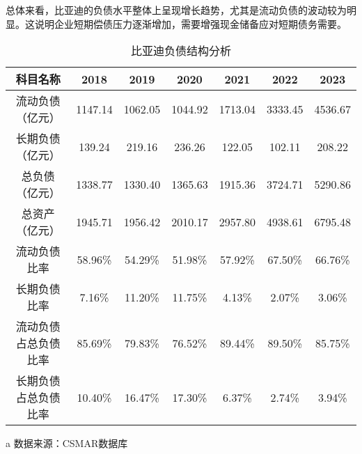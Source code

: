 总体来看，比亚迪的负债水平整体上呈现增长趋势，尤其是流动负债的波动较为明显。这说明企业短期偿债压力逐渐增加，需要增强现金储备应对短期债务需要。
\begin{table}
  \centering
  \begin{threeparttable}[c]
    \caption{比亚迪负债结构分析}
    \label{tab:debt-structure}
    \begin{tabular}{ccccccc}
      \toprule
        科目名称 & 2018 & 2019 & 2020 & 2021 & 2022 & 2023 \\ 
      \midrule
        流动负债（亿元） & 1147.14  & 1062.05  & 1044.92  & 1713.04  & 3333.45  & 4536.67  \\ 
        长期负债（亿元） & 139.24  & 219.16  & 236.26  & 122.05  & 102.11  & 208.22  \\ 
        总负债（亿元） & 1338.77  & 1330.40  & 1365.63  & 1915.36  & 3724.71  & 5290.86  \\ 
        总资产（亿元） & 1945.71  & 1956.42  & 2010.17  & 2957.80  & 4938.61  & 6795.48  \\ 
        流动负债比率 & 58.96\% & 54.29\% & 51.98\% & 57.92\% & 67.50\% & 66.76\% \\ 
        长期负债比率 & 7.16\% & 11.20\% & 11.75\% & 4.13\% & 2.07\% & 3.06\% \\ 
        流动负债占总负债比率 & 85.69\% & 79.83\% & 76.52\% & 89.44\% & 89.50\% & 85.75\% \\ 
        长期负债占总负债比率 & 10.40\% & 16.47\% & 17.30\% & 6.37\% & 2.74\% & 3.94\% \\ 
      \bottomrule
    \end{tabular}
    \begin{tablenotes}
      \item [a] 数据来源：CSMAR数据库
    \end{tablenotes}
  \end{threeparttable}
\end{table}

